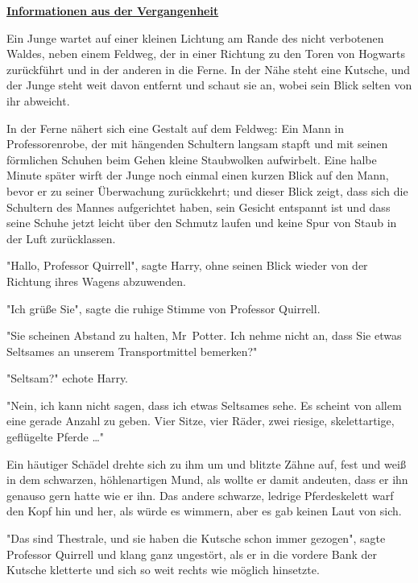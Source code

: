 

\hypertarget{informationen-aus-der-vergangenheit}{%

\textbf{\uline{Informationen aus der Vergangenheit}}

Ein Junge wartet auf einer kleinen Lichtung am Rande des nicht verbotenen Waldes, neben einem Feldweg, der in einer Richtung zu den Toren von Hogwarts zurückführt und in der anderen in die Ferne. In der Nähe steht eine Kutsche, und der Junge steht weit davon entfernt und schaut sie an, wobei sein Blick selten von ihr abweicht.

In der Ferne nähert sich eine Gestalt auf dem Feldweg: Ein Mann in Professorenrobe, der mit hängenden Schultern langsam stapft und mit seinen förmlichen Schuhen beim Gehen kleine Staubwolken aufwirbelt. Eine halbe Minute später wirft der Junge noch einmal einen kurzen Blick auf den Mann, bevor er zu seiner Überwachung zurückkehrt; und dieser Blick zeigt, dass sich die Schultern des Mannes aufgerichtet haben, sein Gesicht entspannt ist und dass seine Schuhe jetzt leicht über den Schmutz laufen und keine Spur von Staub in der Luft zurücklassen.

"Hallo, Professor Quirrell", sagte Harry, ohne seinen Blick wieder von der Richtung ihres Wagens abzuwenden.

"Ich grüße Sie", sagte die ruhige Stimme von Professor Quirrell.

"Sie scheinen Abstand zu halten, Mr~Potter. Ich nehme nicht an, dass Sie etwas Seltsames an unserem Transportmittel bemerken?"

"Seltsam?" echote Harry.

"Nein, ich kann nicht sagen, dass ich etwas Seltsames sehe. Es scheint von allem eine gerade Anzahl zu geben. Vier Sitze, vier Räder, zwei riesige, skelettartige, geflügelte Pferde …"

Ein häutiger Schädel drehte sich zu ihm um und blitzte Zähne auf, fest und weiß in dem schwarzen, höhlenartigen Mund, als wollte er damit andeuten, dass er ihn genauso gern hatte wie er ihn. Das andere schwarze, ledrige Pferdeskelett warf den Kopf hin und her, als würde es wimmern, aber es gab keinen Laut von sich.

"Das sind Thestrale, und sie haben die Kutsche schon immer gezogen", sagte Professor Quirrell und klang ganz ungestört, als er in die vordere Bank der Kutsche kletterte und sich so weit rechts wie möglich hinsetzte.

}
